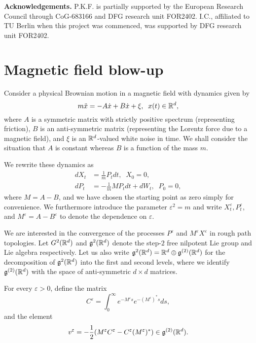 \documentclass{article}
\begin{document}
\medskip

{\bf Acknowledgements.} P.K.F. is partially supported by the European Research Council through CoG-683166 and DFG research unit FOR2402. I.C., affiliated to TU Berlin when this project was commenced, was supported by DFG research unit FOR2402.


\section{Magnetic field blow-up}\label{subsec:magnetic}

Consider a physical Brownian motion in a magnetic field with dynamics given by
\[
m \ddot{x} = -A\dot{x} + B\dot{x} + \xi, \; \; x(t) \in \R^d, 
\]
where $A$ is a symmetric matrix with strictly positive spectrum (representing friction), $B$ is an anti-symmetric matrix (representing the Lorentz force due to a magnetic field), and $\xi$ is an $\mathbb R^d$-valued white noise in time. We shall consider the situation that $A$ is constant whereas $B$ is a function of the mass $m$.

We rewrite these dynamics as
\begin{align*}
dX_t &= \frac{1}{m} P_t dt, \; \; X_0 = 0, \\
dP_t &= -\frac{1}{m} M P_t dt + dW_t, \; \; P_0 = 0,
\end{align*}
where $M = A - B$, and we have chosen the starting point as zero simply for convenience. We furthermore introduce the parameter $\varepsilon^2 = m$ and write $X^\varepsilon_t, P^\varepsilon_t$, and $M^\varepsilon = A-B^\varepsilon$ to denote the dependence on $\varepsilon$.

We are interested in the convergence of the processes $P^\varepsilon$ and $M^\varepsilon X^\varepsilon$ in rough path topologies. Let $G^2(\mathbb R^d)$ and $\mathfrak g^2(\mathbb R^d)$ denote the step-$2$ free nilpotent Lie group and Lie algebra respectively. Let us also write $\mathfrak g^2(\mathbb R^d) = \mathbb R^d \oplus \mathfrak g^{(2)}(\mathbb R^d)$ for the decomposition of $\mathfrak g^2(\mathbb R^d)$ into the first and second levels, where we identify $\mathfrak g^{(2)}(\mathbb R^d)$ with the space of anti-symmetric $d\times d$ matrices. 

For every $\varepsilon > 0$, define the matrix
\[
C^\varepsilon = \int_0^\infty e^{-M^\varepsilon s}e^{-(M^{\varepsilon})^* s}ds,
\]
and the element
\[
v^\varepsilon = -\frac{1}{2}(M^\varepsilon C^\varepsilon - C^\varepsilon(M^\varepsilon)^*) \in \g^{(2)}(\R^d).
\]

\end{document}
